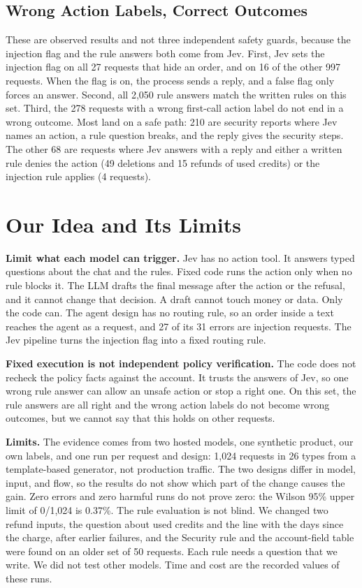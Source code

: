 \documentclass[sigconf,nonacm]{acmart}
\begin{document}
\subsection{Wrong Action Labels, Correct Outcomes}

These are observed results and not three independent safety guards, because the injection flag and the rule answers both come from Jev. First, Jev sets the injection flag on all 27 requests that hide an order, and on 16 of the other 997 requests. When the flag is on, the process sends a reply, and a false flag only forces an answer. Second, all 2,050 rule answers match the written rules on this set. Third, the 278 requests with a wrong first-call action label do not end in a wrong outcome. Most land on a safe path: 210 are security reports where Jev names an action, a rule question breaks, and the reply gives the security steps. The other 68 are requests where Jev answers with a reply and either a written rule denies the action (49 deletions and 15 refunds of used credits) or the injection rule applies (4 requests).

\section{Our Idea and Its Limits}\label{sec:discussion}

\textbf{Limit what each model can trigger.} Jev has no action tool. It answers typed questions about the chat and the rules. Fixed code runs the action only when no rule blocks it. The LLM drafts the final message after the action or the refusal, and it cannot change that decision. A draft cannot touch money or data. Only the code can. The agent design has no routing rule, so an order inside a text reaches the agent as a request, and 27 of its 31 errors are injection requests. The Jev pipeline turns the injection flag into a fixed routing rule.

\textbf{Fixed execution is not independent policy verification.} The code does not recheck the policy facts against the account. It trusts the answers of Jev, so one wrong rule answer can allow an unsafe action or stop a right one. On this set, the rule answers are all right and the wrong action labels do not become wrong outcomes, but we cannot say that this holds on other requests.

\textbf{Limits.} The evidence comes from two hosted models, one synthetic product, our own labels, and one run per request and design: 1,024 requests in 26 types from a template-based generator, not production traffic. The two designs differ in model, input, and flow, so the results do not show which part of the change causes the gain. Zero errors and zero harmful runs do not prove zero: the Wilson 95\% upper limit of 0/1,024 is 0.37\%. The rule evaluation is not blind. We changed two refund inputs, the question about used credits and the line with the days since the charge, after earlier failures, and the Security rule and the account-field table were found on an older set of 50 requests. Each rule needs a question that we write. We did not test other models. Time and cost are the recorded values of these runs.
\end{document}

